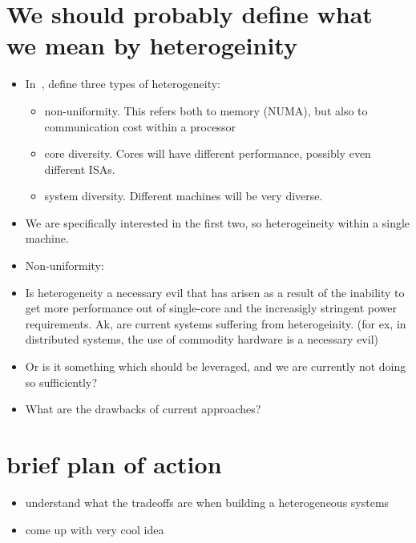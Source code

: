 \section{We should probably define what
we mean by heterogeinity}

\begin{itemize}
\item In~\cite{SPBRBHI:08}, define three types of heterogeneity:
\begin{itemize}
\item non-uniformity.  This refers both to memory (NUMA), but also
to communication cost within a processor
\item core diversity. Cores will have different performance, possibly
even different ISAs.
\item system diversity. Different machines will be very diverse.
\end{itemize}
\item We are specifically interested in the first two, so heterogeineity
within a single machine.
\item Non-uniformity:
\item Is heterogeneity a necessary evil that has arisen as
a result of the inability to get more performance out of single-core
and the increasigly stringent power requirements. Ak,
are current systems suffering from heterogeinity. (for ex,
in distributed systems, the use of commodity hardware is a necessary evil)
\item Or is it something which should be leveraged, and we are currently
not doing so sufficiently?
\item What are the drawbacks of current approaches?
\end{itemize}
\section{brief plan of action}
\begin{itemize}
 \item understand what the tradeoffs are
when building a heterogeneous systems
 \item come up with very cool idea
\end{itemize}
